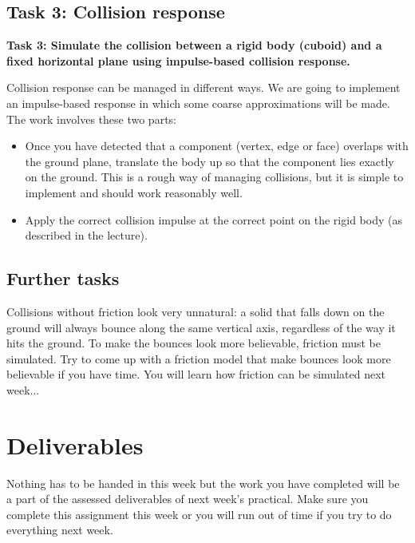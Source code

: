 \documentclass[12pt]{article}
\begin{document}
\subsection*{Task 3: Collision response}

\textbf{Task 3: Simulate the collision between a rigid body (cuboid) and a fixed horizontal plane using impulse-based collision response.}

Collision response can be managed in different ways. We are going to implement an impulse-based response in which some coarse approximations will be made. The work involves these two parts:

\begin{itemize}
\item Once you have detected that a component (vertex, edge or face) overlaps with the ground plane, translate the body up so that the component lies exactly on the ground. This is a rough way of managing collisions, but it is simple to implement and should work reasonably well.
\item Apply the correct collision impulse at the correct point on the rigid body (as described in the lecture).
\end{itemize}

\subsection{Further tasks}

Collisions without friction look very unnatural: a solid that falls down on the ground will always bounce along the same vertical axis, regardless of the way it hits the ground. To make the bounces look more believable, friction must be simulated. Try to come up with a friction model that make bounces look more believable if you have time. You will learn how friction can be simulated next week... 

\section*{Deliverables}

Nothing has to be handed in this week but the work you have completed will be a part of the assessed deliverables of next week’s practical. Make sure you complete this assignment this week or you will run out of time if you try to do everything next week.
\end{document}
